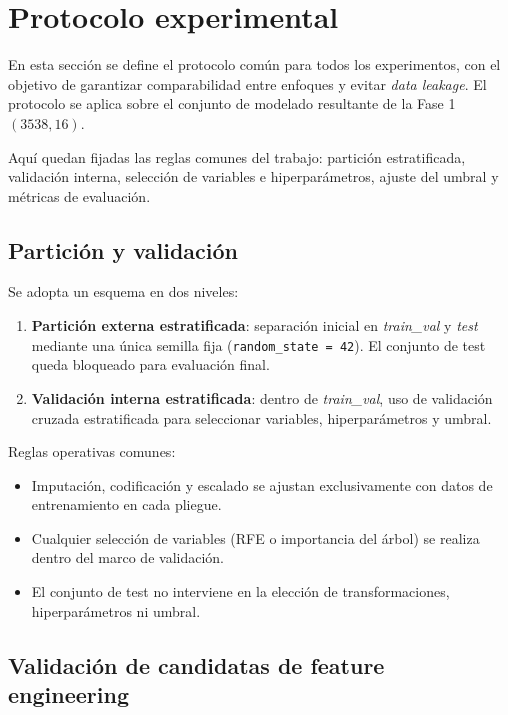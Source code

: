 \section{Protocolo experimental}

En esta sección se define el protocolo común para todos los experimentos, con el objetivo de garantizar comparabilidad entre enfoques y evitar \textit{data leakage}. El protocolo se aplica sobre el conjunto de modelado resultante de la Fase 1 \((3538, 16)\).

Aquí quedan fijadas las reglas comunes del trabajo: partición estratificada, validación interna, selección de variables e hiperparámetros, ajuste del umbral y métricas de evaluación.

\subsection{Partición y validación}

Se adopta un esquema en dos niveles:

\begin{enumerate}
	\item \textbf{Partición externa estratificada}: separación inicial en \textit{train\_val} y \textit{test} mediante una única semilla fija (\texttt{random\_state = 42}). El conjunto de test queda bloqueado para evaluación final.
	\item \textbf{Validación interna estratificada}: dentro de \textit{train\_val}, uso de validación cruzada estratificada para seleccionar variables, hiperparámetros y umbral.
\end{enumerate}

Reglas operativas comunes:

\begin{itemize}
	\item Imputación, codificación y escalado se ajustan exclusivamente con datos de entrenamiento en cada pliegue.
	\item Cualquier selección de variables (RFE o importancia del árbol) se realiza dentro del marco de validación.
	\item El conjunto de test no interviene en la elección de transformaciones, hiperparámetros ni umbral.
\end{itemize}

\subsection{Validación de candidatas de feature engineering}

